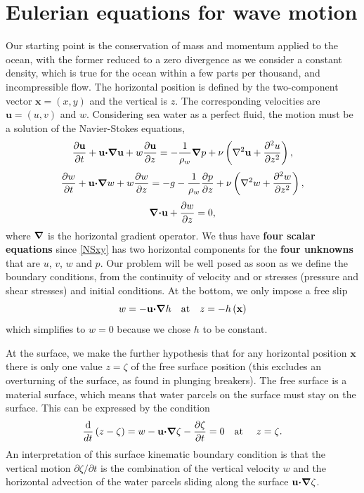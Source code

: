 \section{Eulerian equations for wave motion}
Our starting point is the conservation of mass and momentum applied to 
the ocean, with the former reduced to a zero divergence as we consider a constant density, which is 
true for the ocean within a few parts per thousand, and incompressible flow. 
The horizontal position is defined by the two-component vector 
${\mathbf x}=\left(x,y\right)$ and the vertical is $z$. The corresponding velocities are 
${\mathbf u}=\left(u,v\right)$ and $w$. Considering sea water as a perfect fluid, 
the motion must be a solution of the Navier-Stokes equations, 
\begin{equation}
    \frac{\partial {\mathbf u}}{\partial t}+{\mathbf u}\mbox{\boldmath $\cdot$}\mbox{\boldmath $\nabla$}{\mathbf u}
    + w \frac{\partial {\mathbf u}}{\partial z}
    =-\frac{1}{\rho_w} \mbox{\boldmath $\nabla$} p +
    \nu \left(\nabla^2 {\mathbf u}+\frac{\partial^2 u}{\partial z^2}\right),
    \label{NSxy}
\end{equation}
\begin{equation}
    \frac{\partial w}{\partial t}+{\mathbf u}\mbox{\boldmath $\cdot$}\mbox{\boldmath $\nabla$} w
    + w \frac{\partial w}{\partial z}
    =-g - \frac{1}{\rho_w} \frac{\partial p}{\partial z} +
    \nu \left(\nabla^2 w+\frac{\partial^2 w}{\partial z^2}\right),
    \label{NSz}
\end{equation}
\begin{equation}
\mbox{\boldmath $\nabla$}\mbox{\boldmath $\cdot$}{\mathbf u} + \frac{\partial w}{\partial z}=0,
\end{equation}
where $\mbox{\boldmath $\nabla$}$ is the horizontal gradient operator. We thus have \textbf{four scalar equations} since \ref{NSxy} has two horizontal components
for the \textbf{four unknowns} that are $u$, $v$,
 $w$ and $p$. Our problem will be well posed as soon as we define the boundary conditions, from the continuity of 
velocity and or stresses (pressure and shear stresses) and initial conditions. At the bottom, we only impose a free slip
 \begin{equation}
w=-{\mathbf u} \mbox{\boldmath $\cdot$} \mbox{\boldmath $\nabla$} h \quad \mbox{at} \quad
z=-h\left({\mathbf x}\right)
\end{equation}
which simplifies to $w=0$ because we chose $h$ to be constant.

At the surface, we make the further hypothesis that for any horizontal position $\mathbf{x}$ there is only one value $z=\zeta$ 
of the free surface position (this excludes an overturning of the surface, as found in plunging breakers). 
The free surface is a material surface, which means that water parcels on the surface must stay on the surface. 
This can be expressed by the condition 
\begin{equation}
    \frac{\rm d}{dt}\left(z-\zeta\right)=
    w - {\mathbf u} \mbox{\boldmath $\cdot$} \mbox{\boldmath $\nabla$} \zeta -\frac{\partial \zeta }{\partial t}= 0
    \quad \mbox{at\ }\quad z=\zeta.\label{eq:skbc}
\end{equation}
An interpretation of this surface kinematic boundary condition 
is that the vertical motion 
${\partial \zeta }/{\partial t}$ is the combination of the vertical velocity 
$w$ and the horizontal advection of the water parcels sliding along the surface ${\mathbf u} \mbox{\boldmath $\cdot$} \mbox{\boldmath $\nabla$} \zeta$.

